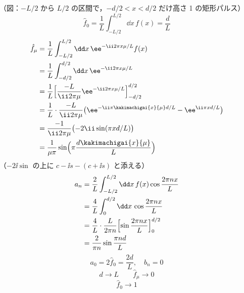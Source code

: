 （図：$-L/2$ から $L/2$ の区間で，$-d/2<x<d/2$ だけ高さ 1 の矩形パルス）
\[ \hat{f}_0=\frac{1}{L}\int_{-L/2}^{L/2}\dd x\,f(x)=\frac{d}{L} \]
\begin{align*}
  \hat{f}_{\mu}&=\frac{1}{L}\int_{-L/2}^{L/2}\dd x\,\ee^{-\ii2\pi x\mu/L}f(x)\\
  &=\frac{1}{L}\int_{-d/2}^{d/2}\dd x\,\ee^{-\ii2\pi x\mu/L}\\
  &=\frac{1}{L}\Bigl[\frac{-L}{\ii2\pi\mu}\ee^{-\ii2\pi x\mu/L}\Bigr]_{-d/2}^{d/2}\\
  &=\frac{1}{L}\cdot\frac{-L}{\ii2\pi\mu}\bigl(\ee^{-\ii\pi\kakimachigai{x}{\mu}d/L}-\ee^{\ii\pi xd/L}\bigr)\\
  &=\frac{-1}{\ii2\pi\mu}\bigl(-2\ii\sin(\pi xd/L)\bigr)\\
  &=\frac{1}{\mu\pi}\sin\Bigl(\pi\frac{d\kakimachigai{x}{\mu}}{L}\Bigr)
\end{align*}
（$-2\ii\sin$ の上に $c-\ii s-(c+\ii s)$ と添える）
\begin{align*}
  a_n&=\frac{2}{L}\int_{-L/2}^{L/2}\dd x\,f(x)\cos\frac{2\pi nx}{L}\\
  &=\frac{4}{L}\int_{0}^{d/2}\dd x\,\cos\frac{2\pi nx}{L}\\
  &=\frac{4}{L}\cdot\frac{L}{2\pi n}\Bigl[\sin\frac{2\pi nx}{L}\Bigr]_{0}^{d/2}\\
  &=\frac{2}{\pi n}\sin\frac{\pi nd}{L}
\end{align*}
\[ a_0=2\hat{f}_0=\frac{2d}{L},\quad b_n=0 \]
\[ d\to L\qquad\hat{f}_{\mu}\to0 \]
\[ \hat{f}_0\to1 \]
